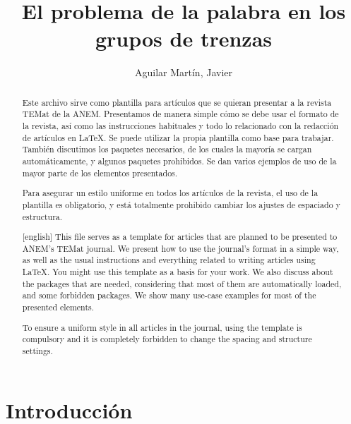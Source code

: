 \documentclass[bibtex, anon]{TEMat-article}
\title[]{El problema de la palabra en los grupos de trenzas}
\author*{Aguilar Martín, Javier}
\affiliation{Universidad de Sevilla (US)}
\begin{document}
\begin{abstract}
Este archivo sirve como plantilla para artículos que se quieran presentar a la revista TEMat de la ANEM.
Presentamos de manera simple cómo se debe usar el formato de la revista, así como las instrucciones habituales y todo lo relacionado con la redacción de artículos en \LaTeX.
Se puede utilizar la propia plantilla como base para trabajar.
También discutimos los paquetes necesarios, de los cuales la mayoría se cargan automáticamente, y algunos paquetes prohibidos.
Se dan varios ejemplos de uso de la mayor parte de los elementos presentados.

Para asegurar un estilo uniforme en todos los artículos de la revista, el uso de la plantilla es obligatorio, y está totalmente prohibido cambiar los ajustes de espaciado y estructura.
\end{abstract}
\begin{abstract}[english]
This file serves as a template for articles that are planned to be presented to ANEM's TEMat journal.
We present how to use the journal's format in a simple way, as well as the usual instructions and everything related to writing articles using \LaTeX.
You might use this template as a basis for your work.
We also discuss about the packages that are needed, considering that most of them are automatically loaded, and some forbidden packages.
We show many use-case examples for most of the presented elements.

To ensure a uniform style in all articles in the journal, using the template is compulsory and it is completely forbidden to change the spacing and structure settings.
\end{abstract}
\maketitle

\section{Introducción}
\end{document}
